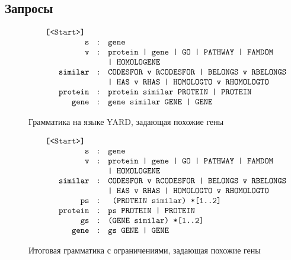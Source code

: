 \documentclass[14pt]{matmex-diploma}
\begin{document}
\subsection{Запросы}

\begin{figure}
$$
\begin{array}{crcl}
&\mbox{\texttt{ [<Start>] }} \\
&\mbox{\texttt{s}} &:& \mbox{\texttt{gene }} \\
&\mbox{\texttt{v}} &:& \mbox{\texttt{protein | gene | GO | PATHWAY | FAMDOM}} \\
&&&\mbox{\texttt{| HOMOLOGENE}} \\
&\mbox{\texttt{similar}} &:& \mbox{\texttt{CODESFOR v RCODESFOR | BELONGS v RBELONGS}} \\
&&&\mbox{\texttt{| HAS v RHAS | HOMOLOGTO v RHOMOLOGTO}} \\
&\mbox{\texttt{protein}} & :& \mbox{\texttt{protein similar PROTEIN | PROTEIN}} \\
&\mbox{\texttt{gene}} & :& \mbox{\texttt{gene similar GENE | GENE}} \\
\end{array}
$$
\caption{Грамматика на языке YARD, задающая похожие гены}
\label{grammar}
\end{figure}

\begin{figure}
$$
\begin{array}{crcl}
&\mbox{\texttt{ [<Start>] }} \\
&\mbox{\texttt{s}} &:& \mbox{\texttt{gene }} \\
&\mbox{\texttt{v}} &:& \mbox{\texttt{protein | gene | GO | PATHWAY | FAMDOM}} \\
&&&\mbox{\texttt{| HOMOLOGENE}} \\
&\mbox{\texttt{similar}} &:& \mbox{\texttt{CODESFOR v RCODESFOR | BELONGS v RBELONGS}} \\
&&&\mbox{\texttt{| HAS v RHAS | HOMOLOGTO v RHOMOLOGTO}} \\
&\mbox{\texttt{ps}} & :& \mbox{\texttt{ (PROTEIN similar) *[1..2]}} \\
&\mbox{\texttt{protein}} & :& \mbox{\texttt{ps PROTEIN | PROTEIN}} \\
&\mbox{\texttt{gs}} & :& \mbox{\texttt{(GENE similar) *[1..2]}} \\
&\mbox{\texttt{gene}} & :& \mbox{\texttt{gs GENE | GENE}} \\
\end{array}
$$
\caption{Итоговая грамматика с ограничениями, задающая похожие гены}
\label{finalgrammar}
\end{figure}
\end{document}
